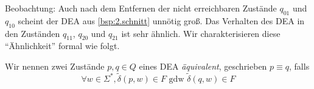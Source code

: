 %         
%
%

\medskip

Beobachtung: Auch nach dem Entfernen der nicht erreichbaren Zustände $q_{01}$ und $q_{10}$ scheint der DEA aus \autoref{bsp:2.schnitt} unnötig groß. Das Verhalten des DEA in den Zuständen $q_{11}$, $q_{20}$ und $q_{21}$ ist sehr ähnlich. 
Wir charakterisieren diese ``Ähnlichkeit'' formal wie folgt.

\begin{Def}[name={[Äquivalenz von \acs*{DEA}-Zuständen]}] %
  Wir nennen zwei Zustände $p,q\in Q$ eines \ac{DEA} \emph{äquivalent}, geschrieben $p\equiv q$, falls
  \begin{displaymath}
  \forall w\in\Sigma^*, \tilde\delta(p,w)\in F \text{ gdw } \tilde\delta(q,w)\in F
\end{displaymath}
\end{Def}

